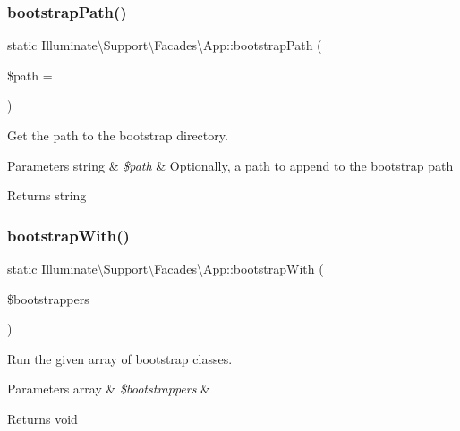 \subsubsection{\texorpdfstring{bootstrap\+Path()}{bootstrapPath()}}
{\footnotesize\ttfamily static Illuminate\textbackslash{}\+Support\textbackslash{}\+Facades\textbackslash{}\+App\+::bootstrap\+Path (\begin{DoxyParamCaption}\item[{}]{\$path = {\ttfamily \textquotesingle{}\textquotesingle{}} }\end{DoxyParamCaption})\hspace{0.3cm}{\ttfamily [static]}}

Get the path to the bootstrap directory.


\begin{DoxyParams}[1]{Parameters}
string & {\em \$path} & Optionally, a path to append to the bootstrap path \\
\hline
\end{DoxyParams}
\begin{DoxyReturn}{Returns}
string 
\end{DoxyReturn}
\mbox{\label{class_illuminate_1_1_support_1_1_facades_1_1_app_a1397831bdc0a4d82c50c7435921d5053}} 
\subsubsection{\texorpdfstring{bootstrap\+With()}{bootstrapWith()}}
{\footnotesize\ttfamily static Illuminate\textbackslash{}\+Support\textbackslash{}\+Facades\textbackslash{}\+App\+::bootstrap\+With (\begin{DoxyParamCaption}\item[{}]{\$bootstrappers }\end{DoxyParamCaption})\hspace{0.3cm}{\ttfamily [static]}}

Run the given array of bootstrap classes.


\begin{DoxyParams}[1]{Parameters}
array & {\em \$bootstrappers} & \\
\hline
\end{DoxyParams}
\begin{DoxyReturn}{Returns}
void 
\end{DoxyReturn}
\mbox{\label{class_illuminate_1_1_support_1_1_facades_1_1_app_aa6d5af98bdd9a231d94c84e2a043ee5a}} 
